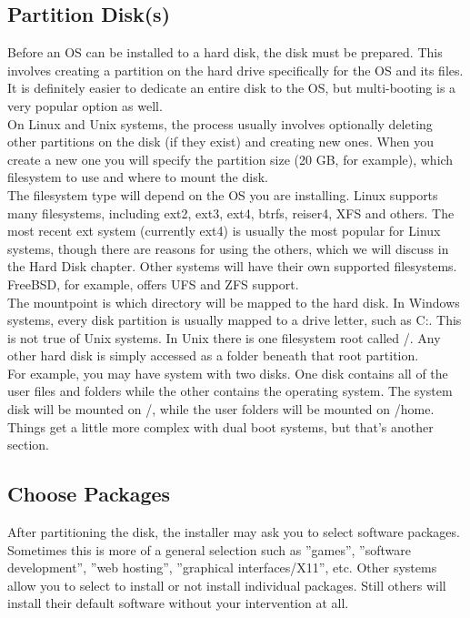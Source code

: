 \subsection{Partition Disk(s)}

Before an OS can be installed to a hard disk, the disk must be prepared.  This involves creating a partition on the hard drive specifically for the OS and its files.  It is definitely easier to dedicate an entire disk to the OS, but multi-booting is a very popular option as well.\\

On Linux and Unix systems, the process usually involves optionally deleting other partitions on the disk (if they exist) and creating new ones.  When you create a new one you will specify the partition size (20 GB, for example), which filesystem to use and where to mount the disk.\\

The filesystem type will depend on the OS you are installing.  Linux supports many filesystems, including ext2, ext3, ext4, btrfs, reiser4, XFS and others.  The most recent ext system (currently ext4) is usually the most popular for Linux systems, though there are reasons for using the others, which we will discuss in the Hard Disk chapter.  Other systems will have their own supported filesystems.  FreeBSD, for example, offers UFS and ZFS support.\\

The mountpoint is which directory will be mapped to the hard disk.  In Windows systems, every disk partition is usually mapped to a drive letter, such as C:.  This is not true of Unix systems.  In Unix there is one filesystem root called /.  Any other hard disk is simply accessed as a folder beneath that root partition.\\

For example, you may have system with two disks.  One disk contains all of the user files and folders while the other contains the operating system.  The system disk will be mounted on /, while the user folders will be mounted on /home.\\

Things get a little more complex with dual boot systems, but that's another section.

\subsection{Choose Packages}

After partitioning the disk, the installer may ask you to select software packages.  Sometimes this is more of a general selection such as ''games'', ''software development'', ''web hosting'', ''graphical interfaces/X11'', etc.  Other systems allow you to select to install or not install individual packages.  Still others will install their default software without your intervention at all.\\

